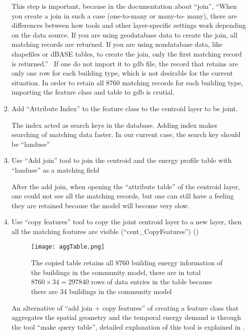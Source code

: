 \begin{enumerate}[1)]
  This step is important, because in the documentation about ``join'',
  ``When you create a join in such a case (one-to-many or many-to-
  many), there are differences between how tools and other
  layer-specific settings work depending on the data source. If you
  are using geodatabase data to create the join, all matching records
  are returned. If you are using nondatabase data, like shapefiles or
  dBASE tables, to create the join, only the first matching record is
  returned.''~\cite{GISjoin2014} If one do not import it to gdb file,
  the record that retains are only one row for each building type,
  which is not desirable for the current situation. In order to retain
  all 8760 matching records for each building type, importing the
  feature class and table to gdb is crutial.

\item Add ``Attribute Index'' to the feature class to the centroid
  layer to be joint.
  
  The index acted as search keys in the database. Adding index makes
  searching of matching data faster. In our current case, the search
  key should be ``landuse''
  
\item Use ``Add join'' tool to join the centroid and the energy
  profile table with ``landuse'' as a matching field

  After the add join, when opening the ``attribute table'' of the
  centroid layer, one could not see all the matching records, but one
  can still have a feeling they are retained because the model will
  become very slow. 

\item Use ``copy features'' tool to copy the joint centroid layer to a
  new layer, then all the matching features are visible
  (``cent\_CopyFeatures'') ()
  
\begin{figure}[h!]
  \centering
  \texttt{[image: aggTable.png]}
  \caption[Table with Time]{The copied table retains all 8760 building
    energy information of the buildings in the community model, there
    are in total $8760 \times 34 = 297840$ rows of data entries in the
    table because there are 34 buildings in the community model}
  \label{fig:aggTable}
\end{figure}

An alternative of ``add join $+$ copy features'' of creating a feature
class that aggregates the spatial geometry and the temporal energy
demand is through the tool ``make query table'', detailed explanation
of this tool is explained in \cite{queryTable2012}.


\end{enumerate}
